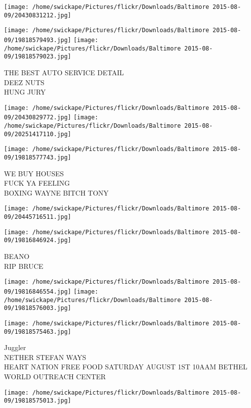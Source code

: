 \documentclass[10pt,letterpaper]{article}
\begin{document}
\texttt{[image: /home/swickape/Pictures/flickr/Downloads/Baltimore 2015-08-09/20430831212.jpg]}

\vspace{0.25in}
\texttt{[image: /home/swickape/Pictures/flickr/Downloads/Baltimore 2015-08-09/19818579493.jpg]}
\texttt{[image: /home/swickape/Pictures/flickr/Downloads/Baltimore 2015-08-09/19818579023.jpg]}

THE BEST AUTO SERVICE DETAIL\\
DEEZ NUTS\\
HUNG JURY\\
\pagebreak

\texttt{[image: /home/swickape/Pictures/flickr/Downloads/Baltimore 2015-08-09/20430829772.jpg]}
\texttt{[image: /home/swickape/Pictures/flickr/Downloads/Baltimore 2015-08-09/20251417110.jpg]}

\texttt{[image: /home/swickape/Pictures/flickr/Downloads/Baltimore 2015-08-09/19818577743.jpg]}

WE BUY HOUSES\\
FUCK YA FEELING\\
BOXING WAYNE BITCH TONY\\
\pagebreak

\texttt{[image: /home/swickape/Pictures/flickr/Downloads/Baltimore 2015-08-09/20445716511.jpg]}

\vspace{0.25in}
\texttt{[image: /home/swickape/Pictures/flickr/Downloads/Baltimore 2015-08-09/19816846924.jpg]}

BEANO\\
RIP BRUCE\\
\pagebreak

\texttt{[image: /home/swickape/Pictures/flickr/Downloads/Baltimore 2015-08-09/19816846554.jpg]}
\texttt{[image: /home/swickape/Pictures/flickr/Downloads/Baltimore 2015-08-09/19818576003.jpg]}

\texttt{[image: /home/swickape/Pictures/flickr/Downloads/Baltimore 2015-08-09/19818575463.jpg]}

Juggler\\
NETHER STEFAN WAYS\\
HEART NATION FREE FOOD SATURDAY AUGUST 1ST 10AAM BETHEL WORLD OUTREACH CENTER\\
\pagebreak

\texttt{[image: /home/swickape/Pictures/flickr/Downloads/Baltimore 2015-08-09/19818575013.jpg]}
\end{document}
